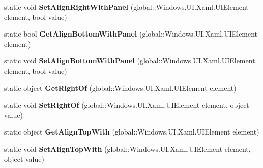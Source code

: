 \begin{DoxyCompactItemize}
static void {\bfseries Set\+Align\+Right\+With\+Panel} (global\+::\+Windows.\+U\+I.\+Xaml.\+U\+I\+Element element, bool value)
\item 
\mbox{\label{class_windows_1_1_u_i_1_1_xaml_1_1_controls_1_1_relative_panel_a5e7cb6ab9a90cb2896e3457bc67ca59b}} 
static bool {\bfseries Get\+Align\+Bottom\+With\+Panel} (global\+::\+Windows.\+U\+I.\+Xaml.\+U\+I\+Element element)
\item 
\mbox{\label{class_windows_1_1_u_i_1_1_xaml_1_1_controls_1_1_relative_panel_a52f3e04276443ca31df8ca10c97cfb60}} 
static void {\bfseries Set\+Align\+Bottom\+With\+Panel} (global\+::\+Windows.\+U\+I.\+Xaml.\+U\+I\+Element element, bool value)
\item 
\mbox{\label{class_windows_1_1_u_i_1_1_xaml_1_1_controls_1_1_relative_panel_ad529f58ba41f4e74aaae2ee84288f5d2}} 
static object {\bfseries Get\+Right\+Of} (global\+::\+Windows.\+U\+I.\+Xaml.\+U\+I\+Element element)
\item 
\mbox{\label{class_windows_1_1_u_i_1_1_xaml_1_1_controls_1_1_relative_panel_a9559e4960630a4b153111ba23f0e51a0}} 
static void {\bfseries Set\+Right\+Of} (global\+::\+Windows.\+U\+I.\+Xaml.\+U\+I\+Element element, object value)
\item 
\mbox{\label{class_windows_1_1_u_i_1_1_xaml_1_1_controls_1_1_relative_panel_a26c367e9f2c099f097099bb693c02c02}} 
static object {\bfseries Get\+Align\+Top\+With} (global\+::\+Windows.\+U\+I.\+Xaml.\+U\+I\+Element element)
\item 
\mbox{\label{class_windows_1_1_u_i_1_1_xaml_1_1_controls_1_1_relative_panel_a6b8a7aa477bd88abf3a2339481e79caa}} 
static void {\bfseries Set\+Align\+Top\+With} (global\+::\+Windows.\+U\+I.\+Xaml.\+U\+I\+Element element, object value)
\item 
\mbox{\label{class_windows_1_1_u_i_1_1_xaml_1_1_controls_1_1_relative_panel_a222a12643fe778467363d2213978054e}} 

\end{DoxyCompactItemize}
